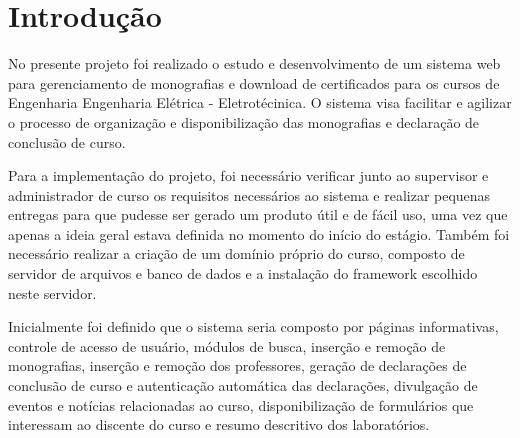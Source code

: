 \documentclass[
	12pt,				%
	openright,			%
	twoside,			%
	a4paper,			%
	english,			%
	french,				%
	spanish,			%
	brazil,				%
	]{abntex2}
\begin{document}

\frenchspacing 


\imprimircapa

\imprimirfolhaderosto*

\setlength{\absparsep}{18pt} %


\tableofcontents*
\cleardoublepage


\chapter{Introdução}

No presente projeto foi realizado o estudo e desenvolvimento de um sistema web para gerenciamento de monografias e download de certificados para os cursos de Engenharia Engenharia Elétrica - Eletrotécinica. O sistema visa facilitar e agilizar o processo de organização e disponibilização das monografias e declaração de conclusão de curso.

Para a implementação do projeto, foi necessário verificar junto ao supervisor e administrador de curso os requisitos necessários ao sistema e realizar pequenas entregas para que pudesse ser gerado um produto útil e de fácil uso, uma vez que apenas a ideia geral estava definida no momento do início do estágio. Também foi necessário realizar a criação de um domínio próprio do curso, composto de servidor de arquivos e banco de dados e a instalação do framework escolhido neste servidor.

Inicialmente foi definido que o sistema seria composto por páginas informativas, controle de acesso de usuário, módulos de busca, inserção e remoção de monografias, inserção e remoção dos professores, geração de declarações de conclusão de curso e autenticação automática das declarações, divulgação de eventos e notícias relacionadas ao curso, disponibilização de formulários que interessam ao discente do curso e resumo descritivo dos laboratórios.
\end{document}
